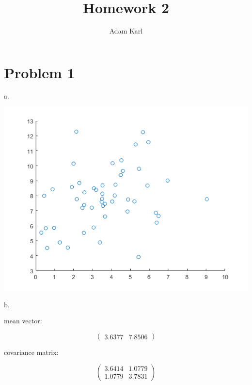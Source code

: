 \documentclass[a4paper]{article}
\title{Homework 2}
\author{Adam Karl}
\begin{document}
\maketitle

\section{Problem 1}

\noindent
a.

\begin{center}
    \includegraphics[scale=1]{1a.png}
\end{center}

\noindent
b. 

\noindent
mean vector: 

$$\left( \begin{matrix} 3.6377 & 7.8506 \end{matrix} \right) $$

\noindent
covariance matrix:


$$\left( \begin{matrix} 3.6414 & 1.0779 \\ 1.0779 & 3.7831 \end{matrix} \right) $$
\end{document}
